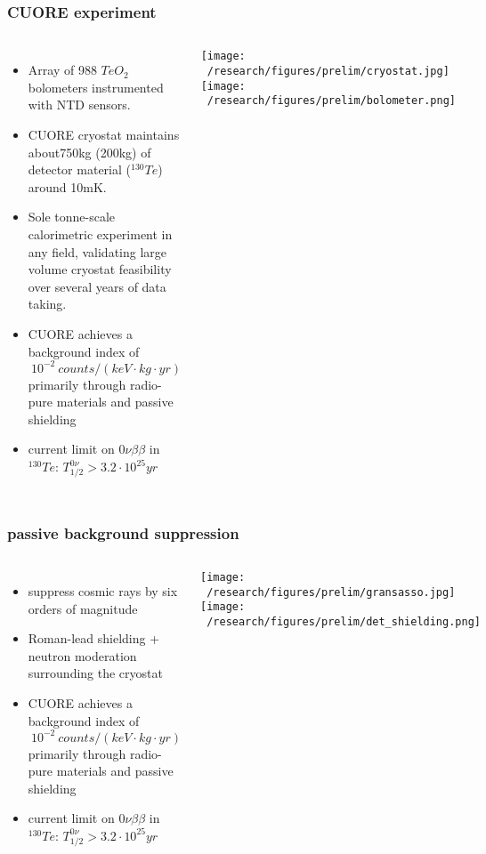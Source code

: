 \documentclass{beamer}
\begin{document}
	\begin{frame}
		\frametitle{CUORE experiment}
		\begin{columns}[c] %
			
			\begin{itemize}
			\item Array of 988 $TeO_2$ bolometers instrumented with NTD sensors.
			\item CUORE	cryostat maintains about750kg (200kg) of detector material ($^{130}Te$) around 10mK.
			\item Sole tonne-scale calorimetric experiment in any field, validating large volume cryostat feasibility over several years of data taking.		
			\item CUORE achieves a background index of $~ 10^{-2} \  counts/(keV\cdot kg \cdot yr)$ primarily through radio-pure materials and passive shielding
			\item current limit on $0\nu\beta\beta$ in $^{130}Te$: $T_{1/2}^{0\nu} > 3.2\cdot 10^{25}yr$ 
			\end{itemize}			 
			
		
			\texttt{[image: ~/research/figures/prelim/cryostat.jpg]}
			\vspace{-10pt}
			\texttt{[image: ~/research/figures/prelim/bolometer.png]}
			
		\end{columns}
	\end{frame}
	
	\begin{frame}
		\frametitle{passive background suppression}
		\begin{columns}[c] %
			
			\begin{itemize}
			\item suppress cosmic rays by six orders of magnitude
			\item Roman-lead shielding + neutron moderation surrounding the cryostat
			\item CUORE achieves a background index of $~ 10^{-2} \  counts/(keV\cdot kg \cdot yr)$ primarily through radio-pure materials and passive shielding
			\item current limit on $0\nu\beta\beta$ in $^{130}Te$: $T_{1/2}^{0\nu} > 3.2\cdot 10^{25}yr$ 
			\end{itemize}			 
			
		
			\texttt{[image: ~/research/figures/prelim/gransasso.jpg]}
			\vspace{-10pt}
			\texttt{[image: ~/research/figures/prelim/det\_shielding.png]}
			
		\end{columns}
	\end{frame}
	
\end{document}

